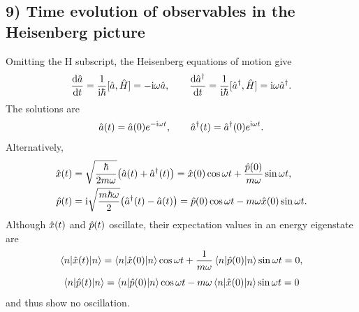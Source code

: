 \subsection*{9) Time evolution of observables in the Heisenberg picture}
Omitting the H subscript, the Heisenberg equations of motion give
\begin{equation}
\frac{\mathrm{d}\hat{a}}{\mathrm{d} t}=\frac1{\mathrm{i}\hbar}[\hat{a},\hat{H}]=-\mathrm{i}\omega\hat{a},\qquad
\frac{\mathrm{d}\hat{a}^{\dagger}}{\mathrm{d} t}=\frac1{\mathrm{i}\hbar}[\hat{a}^{\dagger},\hat{H}]
=\mathrm{i}\omega\hat{a}^{\dagger}.
\end{equation}
The solutions are
\begin{equation}
\hat{a}(t)=\hat{a}(0)e^{-\mathrm{i}\omega t},\qquad
\hat{a}^{\dagger}(t)=\hat{a}^{\dagger}(0)e^{\mathrm{i}\omega t}.
\end{equation}
Alternatively,
\begin{equation}
\begin{split}
\hat{x}(t)&=\sqrt{\frac\hbar{2m\omega}}\bigl(\hat{a}(t)+\hat{a}^{\dagger}(t)\bigr)
=\hat{x}(0)\cos\omega t+\frac{\hat{p}(0)}{m\omega}\sin\omega t,\\
\hat{p}(t)&=\mathrm{i}\sqrt{\frac{m\hbar\omega}{2}}\bigl(\hat{a}^{\dagger}(t)-\hat{a}(t)\bigr)
=\hat{p}(0)\cos\omega t-m\omega\hat{x}(0)\sin\omega t.
\end{split}
\end{equation}
Although $\hat{x}(t)$ and $\hat{p}(t)$ oscillate, their expectation values in an energy eigenstate are
\begin{equation}
\left\langle n\middle|\hat{x}(t)\middle|n\right\rangle
=\left\langle n\middle|\hat{x}(0)\middle|n\right\rangle\cos\omega t+
\frac1{m\omega}\left\langle n\middle|\hat{p}(0)\middle|n\right\rangle\sin\omega t=0,
\end{equation}
\begin{equation}
\left\langle n\middle|\hat{p}(t)\middle|n\right\rangle
=\left\langle n\middle|\hat{p}(0)\middle|n\right\rangle\cos\omega t-m\omega\left\langle n\middle|\hat{x}(0)\middle|n\right\rangle\sin\omega t=0
\end{equation}
and thus show no oscillation.